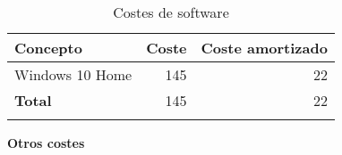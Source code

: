 \begin{longtable}[]{@{}lrr@{}}
	\toprule
	\begin{minipage}[b]{0.29\columnwidth}\raggedright\strut
		\textbf{Concepto}\strut
	\end{minipage} & \begin{minipage}[b]{0.18\columnwidth}\raggedright\strut
		\textbf{Coste}\strut
	\end{minipage} & \begin{minipage}[b]{0.32\columnwidth}\raggedright\strut
		\textbf{Coste amortizado}\strut
	\end{minipage}\tabularnewline
	\midrule
	\endhead
	\begin{minipage}[t]{0.29\columnwidth}\raggedright\strut
		Windows 10 Home\strut
	\end{minipage} & \begin{minipage}[t]{0.18\columnwidth}\raggedright\strut
		145 \officialeuro\strut
	\end{minipage} & \begin{minipage}[t]{0.32\columnwidth}\raggedright\strut
		22 \officialeuro\strut
	\end{minipage}\tabularnewline
	\midrule
	\begin{minipage}[t]{0.29\columnwidth}\raggedright\strut
		\textbf{Total}\strut
	\end{minipage} & \begin{minipage}[t]{0.18\columnwidth}\raggedright\strut
		145 \officialeuro\strut
	\end{minipage} & \begin{minipage}[t]{0.32\columnwidth}\raggedright\strut
		22 \officialeuro\strut
	\end{minipage}\tabularnewline
	\bottomrule
	\caption{Costes de software}
\end{longtable}

\textbf{Otros costes}

